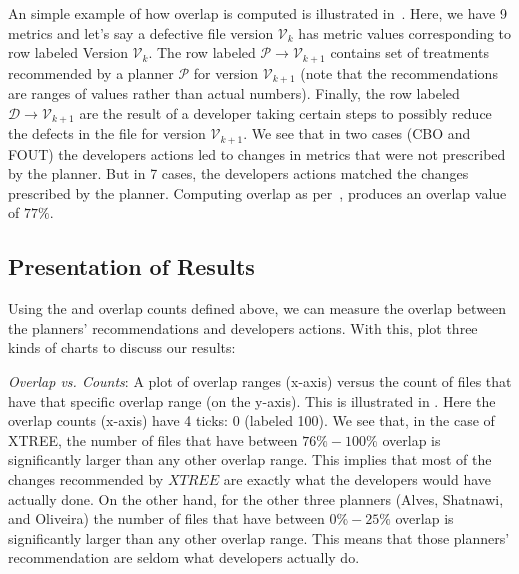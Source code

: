 An simple example of how overlap is computed is illustrated in~. Here, we have 9 metrics and let's say a defective file version $\mathcal{V}_{k}$ has metric values corresponding to row labeled Version $\mathcal{V}_{k}$. The row labeled $\mathcal{P}\rightarrow\mathcal{V}_{k+1}$ contains set of treatments recommended by a planner $\mathcal{P}$ for version $\mathcal{V}_{k+1}$ (note that the recommendations are ranges of values rather than actual numbers). Finally, the row labeled $\mathcal{D}\rightarrow\mathcal{V}_{k+1}$ are the result of a developer taking certain steps to possibly reduce the defects in the file for version $\mathcal{V}_{k+1}$. We see that in two cases (CBO and FOUT) the developers actions led to changes in metrics that were not prescribed by the planner. But in 7 cases, the developers actions matched the changes prescribed by the planner. Computing overlap as per~, produces an overlap value of $77\%$.

\subsection{Presentation of Results}

Using the {\ktest}  and overlap counts defined above,
we can measure  the overlap between the planners' recommendations and developers actions. With this, plot three kinds of charts to discuss our results:

\be
\item \textit{Overlap vs. Counts}: A plot of overlap ranges (x-axis) versus the count of files that have that specific overlap range (on the y-axis). This is illustrated in . Here the overlap counts (x-axis) have 4 ticks: 0 (labeled 100). We see that, in the case of XTREE, the number of files that have between $76\%-100\%$ overlap is significantly larger than any other overlap range. This implies that most of the changes recommended by $XTREE$ are exactly what the developers would have actually done. On the other hand, for the other three planners (Alves, Shatnawi, and Oliveira) the number of files that have between $0\%-25\%$ overlap is significantly larger than any other overlap range. This means that those planners' recommendation are seldom what developers actually do.

